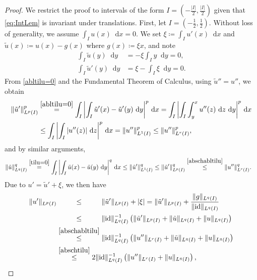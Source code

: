 \documentclass{article}
\newcommand{\dd}{\mathop{}\mathrm{d}} %
\newcommand{\tilu}{\tilde{u}}
\numberwithin{figure}{section}
\numberwithin{equation}{section}
\begin{document}
\begin{proof}
We restrict the proof to intervals of the form $I=(-\frac {|I|}{2}, \frac{|I|}{2})$ given that \eqref{eq:IntLem} is invariant under translations. First, let $I=(-\frac 12 , \frac 12)$. Without loss of generality, we assume $\int_I u(x) \dd x=0$. We set $\xi \coloneq  \int_I u'(x)\dd x$ and $\tilu(x) \coloneq  u(x) - g(x)$ where $g(x) \coloneq  \xi x$, and note
\begin{align}
    \int_I \tilu(y)\dd y & = -\xi\int_I y\dd y = 0, \label{tilu=0} \\
    \int_I \tilu'(y)\dd y & = \xi - \int_I \xi\dd y = 0. \label{abltilu=0}
\end{align}
From \eqref{abltilu=0} and the Fundamental Theorem of Calculus, using $\tilu''=u''$, we obtain
\begin{align} \label{abschabltilu}
\begin{split}
    \|\tilu'\|_{L^p(I)}^p & \overset{\eqref{abltilu=0}}{=}  \int_I \left| \int_I \tilu'(x) -  \tilu'(y)\dd y \right|^p \dd x
    =  \int_I \left| \int_I \int_y^x u''(z)\dd z \dd y \right|^p \dd x \\
    & \leq \int_I \left| \int_I |u''(z)| \dd z \right|^p \dd x
    = \|u''\|_{L^1(I)}^p \leq \|u''\|_{L^r(I)}^p,
\end{split}
\end{align}
and by similar arguments,
\begin{align} \label{abschtilu}
     \|\tilu\|_{L^q(I)}^q & \overset{\eqref{tilu=0}}{=}  \int_I \left| \int_I \tilu(x) -  \tilu(y)\dd y \right|^q \dd x
     \leq \|\tilu'\|_{L^1(I)}^q 
     \leq \|\tilu'\|_{L^p(I)}^q \overset{\eqref{abschabltilu}}{\leq} \|u''\|_{L^r(I)}^q.
\end{align}
Due to $u'= \tilu' +\xi$, we then have
\begin{align}
    \|u'\|_{L^p(I)} & \overset{\hphantom{\eqref{abschabltilu}}}{\leq} \|\tilu'\|_{L^p(I)} + |\xi|
    = \|\tilu'\|_{L^p(I)} + \frac{\|g\|_{L^q(I)}}{\|\text{id}\|_{L^q(I)}} \\
    & \overset{\hphantom{\eqref{abschabltilu}}}{\leq} \|\text{id}\|_{L^q(I)}^{-1} \left( \|\tilu'\|_{L^p(I)} + \|\tilu\|_{L^q(I)} + \|u\|_{L^q(I)} \right) \\
    & \overset{\eqref{abschabltilu}}{\leq} \|\text{id}\|_{L^q(I)}^{-1} \left( \|u''\|_{L^r(I)} + \|\tilu\|_{L^q(I)} + \|u\|_{L^q(I)} \right) \\
    & \overset{\eqref{abschtilu}}{\leq} 2 \|\text{id}\|_{L^q(I)}^{-1} \left( \|u''\|_{L^r(I)} + \|u\|_{L^q(I)} \right),
\end{align}

\end{proof}
\end{document}

